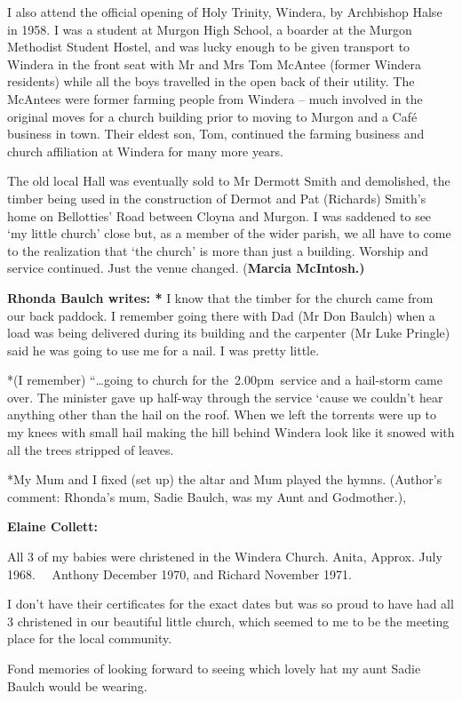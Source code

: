 I also attend the official opening of Holy Trinity, Windera, by
Archbishop Halse in 1958. I was a student at Murgon High School, a
boarder at the Murgon Methodist Student Hostel, and was lucky enough to
be given transport to Windera in the front seat with Mr and Mrs Tom
McAntee (former Windera residents) while all the boys travelled in the
open back of their utility. The McAntees were former farming people from
Windera -- much involved in the original moves for a church building
prior to moving to Murgon and a Café business in town. Their eldest son,
Tom, continued the farming business and church affiliation at Windera
for many more years.

The old local Hall was eventually sold to Mr Dermott Smith and
demolished, the timber being used in the construction of Dermot and Pat
(Richards) Smith's home on Bellotties' Road between Cloyna and Murgon. I
was saddened to see `my little church' close but, as a member of the
wider parish, we all have to come to the realization that `the church'
is more than just a building. Worship and service continued. Just the
venue changed. (\textbf{Marcia McIntosh.)}

\textbf{Rhonda Baulch writes: *} I know that the timber for the church
came from our back paddock. I remember going there with Dad (Mr Don
Baulch) when a load was being delivered during its building and the
carpenter (Mr Luke Pringle) said he was going to use me for a nail. I
was pretty little.

*(I remember) ``\ldots going to church for the~2.00pm~service and a
hail-storm came over. The minister gave up half-way through the service
`cause we couldn't hear anything other than the hail on the roof. When
we left the torrents were up to my knees with small hail making the hill
behind Windera look like it snowed with all the trees stripped of
leaves.

*My Mum and I fixed (set up) the altar and Mum played the hymns.
(Author's comment: Rhonda's mum, Sadie Baulch, was my Aunt and
Godmother.),

\textbf{Elaine Collett:}

All 3 of my babies were christened in the Windera Church. Anita, Approx.
July 1968.~~ Anthony December 1970, and Richard November 1971.

I don't have their certificates for the exact dates but was so proud to
have had all 3 christened in our beautiful little church, which seemed
to me to be the meeting place for the local community.

Fond memories of looking forward to seeing which lovely hat my aunt
Sadie Baulch would be wearing.


